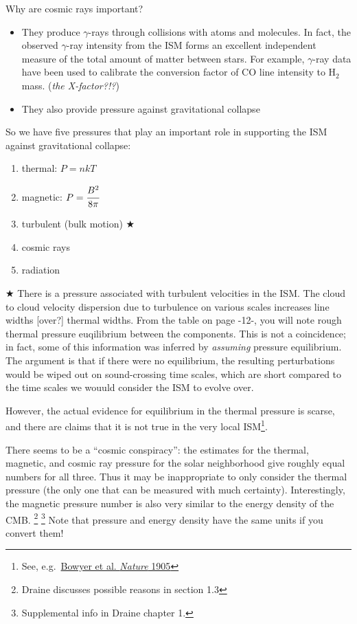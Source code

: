 \documentclass[11pt]{article}
\newcommand{\mar}[1]{\hspace{0pt}\marginpar{-\textcolor{black}{#1}-}}
\newcommand{\mynotes}[1]{{\fontfamily{cmss}\selectfont \textit{#1}}}
\begin{document}
\mar{14}Why are cosmic rays important?
\begin{itemize}
    \item They produce $\gamma$-rays through collisions with atoms and
        molecules. In fact, the observed $\gamma$-ray intensity from the ISM forms
        an excellent independent measure of the total amount of matter
        between stars. For example, $\gamma$-ray data have been used to calibrate
        the conversion factor of CO line intensity to H$_{2}$ mass.
        (\mynotes{the X-factor?!?})
    \item They also provide pressure against gravitational collapse
\end{itemize}

So we have five pressures that play an important role in supporting the ISM
against gravitational collapse:
\begin{enumerate}
    \item thermal: $P=nkT$
    \item magnetic: $P=\cfrac{B^{2}}{8\pi}$
    \item turbulent (bulk motion) \textcolor{mypur}{$\bigstar$}
    \item cosmic rays
    \item radiation
\end{enumerate}
\textcolor{mypur}{$\bigstar$}
There is a pressure associated with turbulent velocities in the ISM. The cloud
to cloud velocity dispersion due to turbulence on various scales increases line
widths [over?] thermal widths. From the table on page -12-, you will note rough
thermal pressure euqilibrium between the components. This is not a coincidence;
in fact, some of this information was inferred by \emph{assuming} pressure
equilibrium. The argument is that if there were no equilibrium, the resulting
perturbations would be wiped out on sound-crossing time scales, which are short
compared \mar{15}to the time scales we wouuld consider the ISM to evolve over.

However, the actual evidence for equilibrium in the thermal pressure
is scarse, and there are claims that it is not true in the very local
ISM\footnote{See, e.g.\ \href{http://www.nature.com/nature/journal/v375/n6528/abs/375212a0.html}
{Bowyer et al. \textit{Nature} 1905}}.

There seems to be a ``cosmic conspiracy'': the estimates for the
thermal, magnetic, and cosmic ray pressure for the solar neighborhood
give roughly equal numbers for all three. Thus it may be inappropriate
to only consider the thermal pressure (the only one that can be
measured with much certainty). Interestingly, the magnetic pressure
number is also very similar to the energy density of the CMB\@.
\footnote{Draine discusses possible reasons in section 1.3}
\footnote{Supplemental info in Draine chapter 1.}
Note that pressure and energy density have the same units if you convert them!
\end{document}
